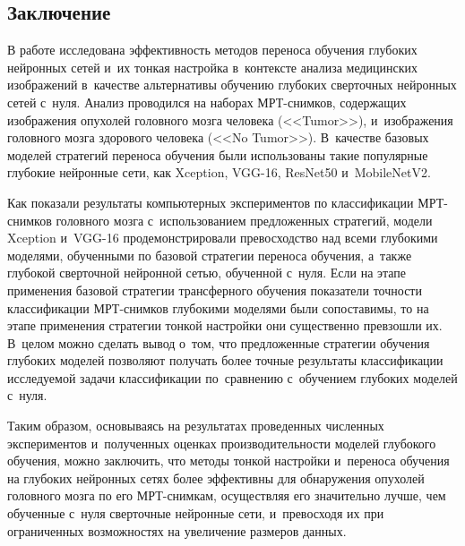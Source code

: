 \begin{multicols}{2}
\section{Заключение}

  В работе исследована эффективность методов переноса обучения глубоких 
нейронных сетей и~их тонкая настройка в~контексте анализа медицинских 
изображений в~качестве альтернативы обучению глубоких сверточных 
нейронных сетей с~нуля. Анализ проводился на наборах МРТ-сним\-ков, 
содержащих изображения опухолей головного мозга человека (<<Tumor>>), 
и~изображения головного мозга здорового человека (<<No Tumor>>). 
В~качестве базовых моделей стратегий переноса обучения были использованы 
такие популярные глубокие нейронные сети, как Xception, VGG-16, ResNet50 
и~\mbox{MobileNetV2}. 
  
  Как показали результаты компьютерных экспериментов по классификации 
МРТ-сним\-ков головного мозга с~использованием предложенных стратегий, 
модели Xception и~VGG-16 продемонстрировали превосходство над всеми 
глубокими моделями, обучен\-ны\-ми по базовой стратегии переноса обуче\-ния, 
а~так\-же глубокой сверточной нейронной \mbox{сетью}, обучен\-ной с~нуля. Если на 
этапе применения базовой стратегии трансферного обуче\-ния показатели 
точности классификации МРТ-сним\-ков глубокими моделями были 
сопоставимы, то на этапе применения стратегии тонкой настройки они 
существенно превзошли их. В~\mbox{целом} можно сделать вывод о~том, что 
предложенные стратегии обуче\-ния глубоких моделей позволяют получать 
более точные результаты классификации ис\-сле\-ду\-емой задачи классификации 
по~сравнению с~обуче\-ни\-ем глубоких моделей с~\mbox{нуля}. 
{

}
  
  Таким образом, основываясь на результатах проведенных численных 
экспериментов и~полученных оценках производительности моделей глубокого 
обучения, можно заключить, что методы тонкой настройки и~переноса 
обучения на глубоких нейронных сетях более эффективны для обнаружения 
опухолей головного мозга по его МРТ-сним\-кам, осуществляя его значительно 
лучше, чем обученные с~нуля сверточные нейронные сети, и~превосходя их при 
ограниченных возможностях на увеличение размеров данных. 
  

\end{multicols}

